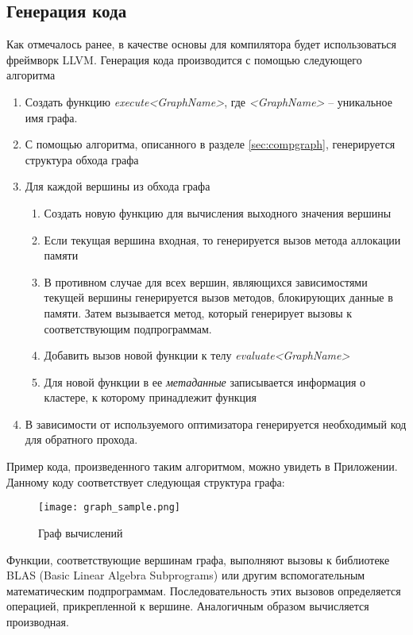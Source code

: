 \subsection{Генерация кода}
Как отмечалось ранее, в качестве основы для компилятора будет использоваться
фреймворк LLVM. Генерация кода производится с помощью следующего алгоритма
\begin{enumerate}
    \item Создать функцию \textit{execute<GraphName>}, где \textit{<GraphName>} -- уникальное имя графа.
    \item С помощью алгоритма, описанного в разделе \ref{sec:compgraph},
        генерируется структура обхода графа
    \item Для каждой вершины из обхода графа
        \begin{enumerate}
            \item Создать новую функцию для вычисления выходного значения
                вершины
            \item Если текущая вершина входная, то генерируется вызов метода
                аллокации памяти
            \item В противном случае для всех вершин, являющихся зависимостями
                текущей вершины генерируется вызов методов, блокирующих
                данные в памяти. Затем вызывается метод, который генерирует
                вызовы к соответствующим подпрограммам.
            \item Добавить вызов новой функции к телу \textit{evaluate<GraphName>}
            \item Для новой функции в ее \textit{метаданные} записывается
                информация о кластере, к которому принадлежит функция
        \end{enumerate}
    \item В зависимости от используемого оптимизатора генерируется необходимый
        код для обратного прохода.
\end{enumerate}

Пример кода, произведенного таким алгоритмом, можно увидеть в Приложении.
Данному коду соответствует следующая структура графа:

\begin{figure}[ht]
    \centering
    \texttt{[image: graph\_sample.png]}
    \caption{Граф вычислений}
    \label{fig:graphsample}
\end{figure}


Функции, соответствующие вершинам графа, выполняют вызовы к библиотеке BLAS
(Basic Linear Algebra Subprograms) или другим вспомогательным математическим
подпрограммам. Последовательность этих вызовов определяется операцией, прикрепленной
к вершине. Аналогичным образом вычисляется производная.

